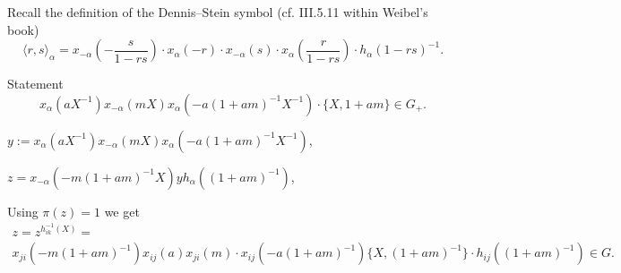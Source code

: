 \documentclass[oneside, 10pt]{amsart}
\theoremstyle{remark} %
\theoremstyle{definition}
\begin{document}
Recall the definition of the Dennis--Stein symbol (cf. III.5.11 within Weibel's book)
\[ \langle r,s \rangle _ \alpha = x_{-\alpha}\left(-\frac{s}{1 - rs}\right) \cdot x_{\alpha}(-r) \cdot x_{-\alpha}(s) \cdot x_{\alpha}\left(\frac{r}{1-rs}\right) \cdot h_{\alpha}(1 - rs)^{-1}. \]


Statement \[x_{\alpha}(aX^{-1}) x_{-\alpha}(mX) x_{\alpha}(-a(1+am)^{-1}X^{-1}) \cdot \{X, 1+am\} \in G_+.\]

$y := x_{\alpha}(aX^{-1}) x_{-\alpha}(mX) x_{\alpha}(-a(1+am)^{-1}X^{-1})$, 

$z = x_{-\alpha}(-m(1+am)^{-1}X) y h_{\alpha}((1+am)^{-1})$,

Using $\pi(z) = 1$ we get 
\begin{multline}z = z^{h_{ik}^{-1}(X)} = \\ x_{ji}(-m(1+am)^{-1}) x_{ij}(a) x_{ji}(m) \cdot x_{ij}(-a(1+am)^{-1})\{X, (1+am)^{-1}\} \cdot h_{ij}((1+am)^{-1}) \in G. \end{multline}
\end{document}

